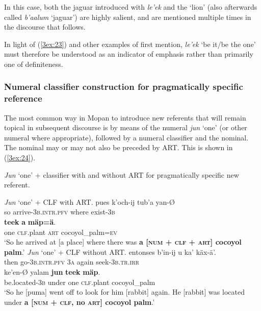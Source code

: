 \documentclass[output=paper]{langsci/langscibook}
\begin{document}
In this case, both the jaguar introduced with {\emph{le'ek}} and the `lion' (also afterwards called {\emph{b'aalum}} `jaguar') are highly salient, and are mentioned multiple times in the discourse that follows. 

In light of (\ref{3ex:23}) and other examples of first mention, {\emph{le'ek}} `be it/be the one' must therefore be understood as an indicator of emphasis rather than primarily one of definiteness.


\subsubsection{Numeral classifier construction for pragmatically specific reference}\label{3sec:334}

The most common way in Mopan to introduce new referents that will remain topical in subsequent discourse is by means of the numeral {\emph{jun}} `one' (or other numeral where appropriate), followed by a numeral classifier and the nominal.  The nominal may or may not also be preceded by ART.  This is shown in (\ref{3ex:24}).


\begin{exe}
\ex\label{3ex:24}
{\emph{Jun}} `one' + classifier with and without ART for pragmatically specific new referent.
	\begin{xlista}
	\ex\label{3ex:24a}
	{\emph{Jun}} `one' + CLF with ART.  
	\exi{}
	\gll	pues	k'och-ij				tub'a		yan-\O \\
		so	arrive-{\textsc{3b.intr.pfv}}	where	exist-{\textsc{3b}} \\
	\glt
	\exi{}
		{\textbf{teek}}		{\textbf{a}}	{\textbf{m\"ap=\"a}}. \\
		one		{\textsc{clf}}.plant	{\textsc{art}}		cocoyol\_palm={\textsc{ev}} \\
	\glt	`So he arrived at [a place] where there was {\textbf{a [{\textsc{num}} + {\textsc{clf}} + {\textsc{art}}] cocoyol palm}}.'
	\ex\label{3ex:24b}
	{\emph{Jun}} `one' + CLF without ART. 
	\exi{}
	\gll	entonses		b'in-ij				u		ka'		k\"ax-\"a'. \\
		then			go-{\textsc{3b.intr.pfv}}	{\textsc{3a}}	again	seek-{\textsc{3b.tr.irr}} \\
	\glt
	\exi{}	
	\gll	ke'en-{\O}			yalam	{\textbf{jun}}	{\textbf{teek}}		{\textbf{m\"ap}}.  \\
		be.located-{\textsc{3b}}	under	one		{\textsc{clf}}.plant	cocoyol\_palm \\
	\glt	`So he [puma] went off to look for him [rabbit] again. He [rabbit] was located under {\textbf{a [{\textsc{num}} + {\textsc{clf}}, no {\textsc{art}}] cocoyol palm}}.'
	\end{xlista}
\end{exe}
\end{document}
